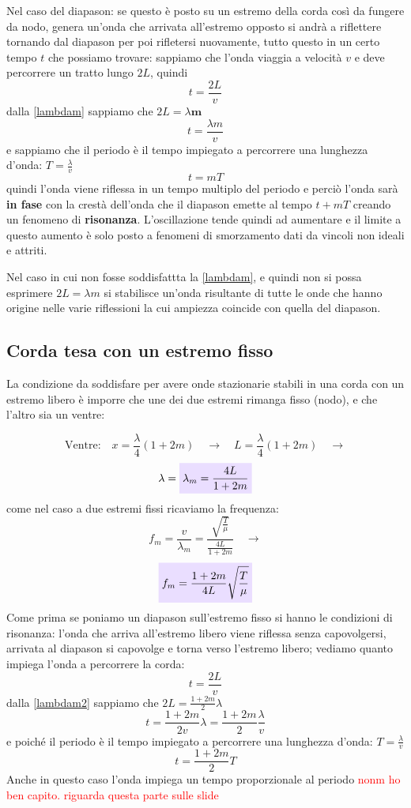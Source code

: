 \documentclass[x11names]{article}
\newcommand{\viola}[1]{\colorbox{yred}{$\displaystyle #1$}}
\begin{document}
		
		Nel caso del diapason: se questo è posto su un estremo della corda così da fungere da nodo, genera un'onda che arrivata all'estremo opposto si andrà a riflettere tornando dal diapason per poi rifletersi nuovamente, tutto questo in un certo tempo \(t\) che possiamo trovare: sappiamo che l'onda viaggia a velocità \(v\) e deve percorrere un tratto lungo \(2L\), quindi 
		\[ 
		t = \frac{2L}{v}
		\]
		dalla \ref{lambdam} sappiamo che \(2L = \lambda \boldsymbol{m}\)
		\[ 
		t = \frac{\lambda m}{v}
		\]
		e sappiamo che il periodo è il tempo impiegato a percorrere una lunghezza d'onda: \(T = \frac{\lambda}{v}\)
		\[ 
		t = mT
		\]
		quindi l'onda viene riflessa in un tempo multiplo del periodo e perciò l'onda sarà \textbf{in fase} con la crestà dell'onda che il diapason emette al tempo \(t + mT\) creando un fenomeno di \textbf{risonanza}. L'oscillazione tende quindi ad aumentare e il limite a questo aumento è solo posto a fenomeni di smorzamento dati da vincoli non ideali e attriti.
		
		Nel caso in cui non fosse soddisfattta la \ref{lambdam}, e quindi non si possa esprimere \(2L = \lambda m\) si stabilisce un'onda risultante di tutte le onde che hanno origine nelle varie riflessioni la cui ampiezza coincide con quella del diapason.
		
		\subsection{Corda tesa con un estremo fisso}
		La condizione da soddisfare per avere onde stazionarie stabili in una corda con un estremo libero è imporre che une dei due estremi rimanga fisso (nodo), e che l'altro sia un ventre:
		
		\[ 
		\text{Ventre:} \quad x = \frac{\lambda}{4}(1+2m) \quad \to \quad L = \frac{\lambda}{4}(1+2m) \quad \to 
		\]
		\begin{equation}\label{lambdam2}
			\lambda = \viola{\lambda_m  = \frac{4L}{1+2m}}
		\end{equation}
		come nel caso a due estremi fissi ricaviamo la frequenza:
		\[ 
		f_m = \frac{v}{\lambda_m} = \frac{\sqrt{\frac{T}{\mu}}}{\frac{4L}{1+2m}} \quad \to
		\]
		\begin{equation}
			\viola{f_m = \frac{1 + 2m}{4L} \sqrt{\frac{T}{\mu}}}
		\end{equation}
		Come prima se poniamo un diapason sull'estremo fisso si hanno le condizioni di risonanza: l'onda che arriva all'estremo libero viene riflessa senza capovolgersi, arrivata al diapason si capovolge e torna verso l'estremo libero; vediamo quanto impiega l'onda a percorrere la corda:
		\[ 
		t = \frac{2L}{v}
		\]
		dalla \ref{lambdam2} sappiamo che \(2L = \frac{1+2m}{2}\lambda\)
		\[ 
		t = \frac{1+2m}{2v}\lambda = \frac{1+2m}{2}\frac{\lambda}{v}
		\]
		e poiché il periodo è il tempo impiegato a percorrere una lunghezza d'onda: \(T=\frac{\lambda}{v}\)
		\[ 
		t = \frac{1+2m}{2}T
		\]
		Anche in questo caso l'onda impiega un tempo proporzionale al periodo \textcolor{red}{nonm ho ben capito. riguarda questa parte sulle slide}
		
\end{document}
